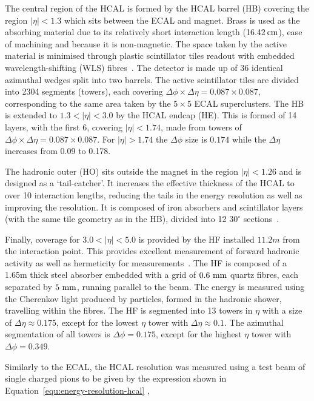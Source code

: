 The central region of the HCAL is formed by the HCAL barrel (HB) covering the region $|\eta| < 1.3$ which sits between
the ECAL and magnet. Brass is used as the absorbing material due to its relatively short interaction length (16.42$\,\text{cm}$), ease of machining 
and because it is non-magnetic. The space taken by the active material is minimised through plastic scintillator tiles
readout with embedded wavelength-shifting (WLS) fibres~\cite{CMS}. The detector is made up of 36 identical azimuthal wedges split into two barrels.
The active scintillator tiles are divided into 2304 segments (towers), each covering $\Delta\phi \times \Delta\eta = 0.087 × 0.087$, corresponding to the 
same area taken by the $5\times5$ ECAL superclusters. The HB is extended to $ 1.3 < |\eta| < 3.0$ by the HCAL endcap (HE). This is formed of 14 layers, 
with the first 6, covering  $|\eta| < 1.74$, made from towers of $\Delta\phi \times \Delta\eta = 0.087 \times 0.087$. For $|\eta| > 1.74$ the $\Delta\phi$
size is $0.174$ while the $\Delta\eta$ increases from 0.09 to 0.178.

The hadronic outer (HO) sits outside the magnet in the region $|\eta| < 1.26$ and is designed as a `tail-catcher'.
It increases the effective thickness of the HCAL to over 10 interaction lengths, reducing the tails in the energy resolution
as well as improving the \met resolution. It is composed of iron absorbers and scintillator layers (with the same tile geometry as in the HB), divided into 
12 $30^\circ$ sections~\cite{hcal_tdr}. 

Finally, coverage for $3.0 < |\eta| < 5.0$ is provided by the HF installed $11.2 m$ from the interaction point. This provides
excellent measurement of forward hadronic activity as well as hermeticity for \met measurements~\cite{hcal_tdr}. The HF is composed of a 1.65m thick steel absorber 
embedded with a grid of $0.6\,\,\text{mm}$ quartz fibres, each separated by $5\,\,\text{mm}$, running parallel to the beam. The energy is measured using the Cherenkov
light produced by particles, formed in the hadronic shower, travelling within the fibres. The HF is segmented into 13 towers in $\eta$ with a
size of $\Delta\eta \approx 0.175$, except for the lowest $\eta$ tower with $\Delta\eta \approx 0.1$. The azimuthal segmentation of all towers is 
$\Delta\phi = 0.175$, except for the highest $\eta$ tower with $\Delta\phi = 0.349$.

Similarly to the ECAL, the HCAL resolution was measured using a test beam of single charged pions to be given by the expression shown in Equation~\ref{equ:energy-resolution-hcal} 
\cite{hcal_performance},

